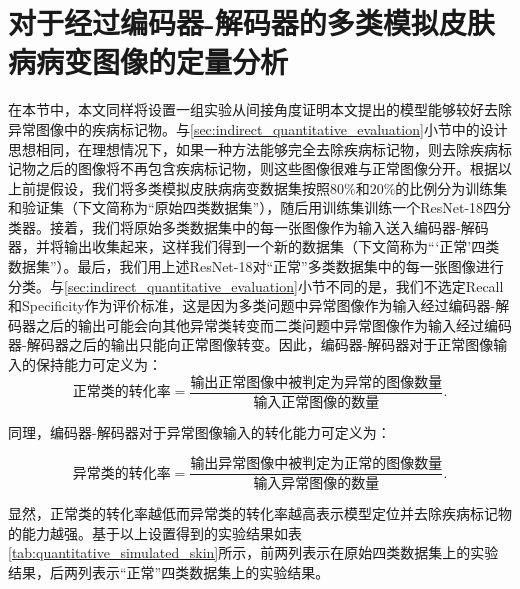 \section{对于经过编码器-解码器的多类模拟皮肤病病变图像的定量分析}
在本节中，本文同样将设置一组实验从间接角度证明本文提出的模型能够较好去除异常图像中的疾病标记物。与\ref{sec:indirect_quantitative_evaluation}小节中的设计思想相同，在理想情况下，如果一种方法能够完全去除疾病标记物，则去除疾病标记物之后的图像将不再包含疾病标记物，则这些图像很难与正常图像分开。根据以上前提假设，我们将多类模拟皮肤病病变数据集按照$80\%$和$20\%$的比例分为训练集和验证集（下文简称为“原始四类数据集”），随后用训练集训练一个ResNet-18四分类器。接着，我们将原始多类数据集中的每一张图像作为输入送入编码器-解码器，并将输出收集起来，这样我们得到一个新的数据集（下文简称为“‘正常’四类数据集”）。最后，我们用上述ResNet-18对“正常”多类数据集中的每一张图像进行分类。与\ref{sec:indirect_quantitative_evaluation}小节不同的是，我们不选定Recall和Specificity作为评价标准，这是因为多类问题中异常图像作为输入经过编码器-解码器之后的输出可能会向其他异常类转变而二类问题中异常图像作为输入经过编码器-解码器之后的输出只能向正常图像转变。因此，编码器-解码器对于正常图像输入的保持能力可定义为：
\begin{equation}\label{equ:normal_imgs_kep_rate}
\text{正常类的转化率}=\frac{\text{输出正常图像中被判定为异常的图像数量}}{\text{输入正常图像的数量}}.
\end{equation}

\noindent 同理，编码器-解码器对于异常图像输入的转化能力可定义为：

\begin{equation}\label{equ:lesion_imgs_converted_rate}
\text{异常类的转化率}=\frac{\text{输出异常图像中被判定为正常的图像数量}}{\text{输入异常图像的数量}}.
\end{equation}

\noindent 显然，正常类的转化率越低而异常类的转化率越高表示模型定位并去除疾病标记物的能力越强。基于以上设置得到的实验结果如表\ref{tab:quantitative_simulated_skin}所示，前两列表示在原始四类数据集上的实验结果，后两列表示“正常”四类数据集上的实验结果。

